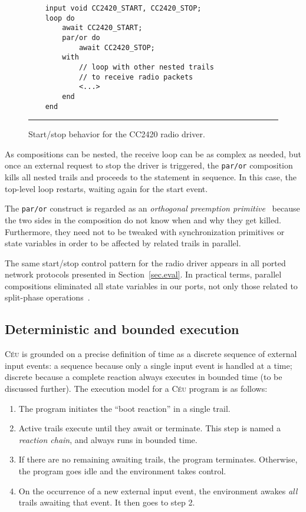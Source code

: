\documentclass[10pt]{sensys-proc}
\newcommand{\CEU}{\textsc{C\'{e}u}\xspace}
\newcommand{\code}[1] {{\small{\texttt{#1}}}}
\begin{document}
\begin{figure}[t]
{\small
\begin{verbatim}
    input void CC2420_START, CC2420_STOP;
    loop do
        await CC2420_START;
        par/or do
            await CC2420_STOP;
        with
            // loop with other nested trails
            // to receive radio packets
            <...>
        end
    end
\end{verbatim}
}%
\rule{8.5cm}{0.37pt}
\caption{ Start/stop behavior for the CC2420 radio driver.
\label{lst.radio}
}
\end{figure}

As compositions can be nested, the receive loop can be as complex as needed, 
but once an external request to stop the driver is triggered, the \code{par/or} 
composition kills all nested trails and proceeds to the statement in sequence.
In this case, the top-level loop restarts, waiting again for the start event.

The \code{par/or} construct is regarded as an \emph{orthogonal preemption 
primitive}~\cite{esterel.preemption} because the two sides in the composition 
do not know when and why they get killed.
Furthermore, they need not to be tweaked with synchronization primitives or 
state variables in order to be affected by related trails in parallel.

The same start/stop control pattern for the radio driver appears in all ported 
network protocols presented in Section~\ref{sec.eval}.
In practical terms, parallel compositions eliminated all state variables in our 
ports, not only those related to split-phase 
operations~\cite{wsn.protothreads}.

\subsection{Deterministic and bounded execution}
\label{sec.ceu.det}


\CEU{} is grounded on a precise definition of time as a discrete sequence of 
external input events:
a sequence because only a single input event is handled at a time; discrete 
because a complete reaction always executes in bounded time (to be discussed 
further).
The execution model for a \CEU{} program is as follows:

\begin{enumerate}
\item The program initiates the ``boot reaction'' in a single trail.
\item Active trails execute until they await or terminate.
      This step is named a \emph{reaction chain}, and always runs in bounded 
      time.
\item If there are no remaining awaiting trails, the program terminates.
      Otherwise, the program goes idle and the environment takes control.
\item On the occurrence of a new external input event, the environment awakes 
      \emph{all} trails awaiting that event.
      It then goes to step 2.
\end{enumerate}
\end{document}
